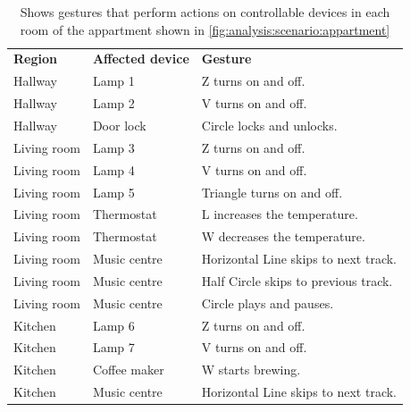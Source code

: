 \begin{table}[]
\centering
\caption{Shows gestures that perform actions on controllable devices in each room of the appartment shown in \cref{fig:analysis:scenario:appartment}}
\label{tbl:analysis:scenario:gesture-configurations}
\begin{tabular}{lll}
\textbf{Region} & \textbf{Affected device} & \textbf{Gesture}                       \\
Hallway                    & Lamp 1                              & Z turns on and off.                      \\
Hallway                    & Lamp 2                              & V turns on and off.                      \\
Hallway                    & Door lock                           & Circle locks and unlocks.                \\
Living room                & Lamp 3                              & Z turns on and off.                      \\
Living room                & Lamp 4                              & V turns on and off.                      \\
Living room                & Lamp 5                              & Triangle turns on and off.               \\
Living room                & Thermostat                          & L increases the temperature.             \\
Living room                & Thermostat                          & W decreases the temperature.             \\
Living room                & Music centre                        & Horizontal Line skips to next track.     \\
Living room                & Music centre                        & Half Circle skips to previous track.     \\
Living room                & Music centre                        & Circle plays and pauses.                 \\
Kitchen                    & Lamp 6                              & Z turns on and off.                      \\
Kitchen                    & Lamp 7                              & V turns on and off.                      \\
Kitchen                    & Coffee maker                        & W starts brewing.                        \\
Kitchen                    & Music centre                        & Horizontal Line skips to next track.     \\

\end{tabular}
\end{table}
